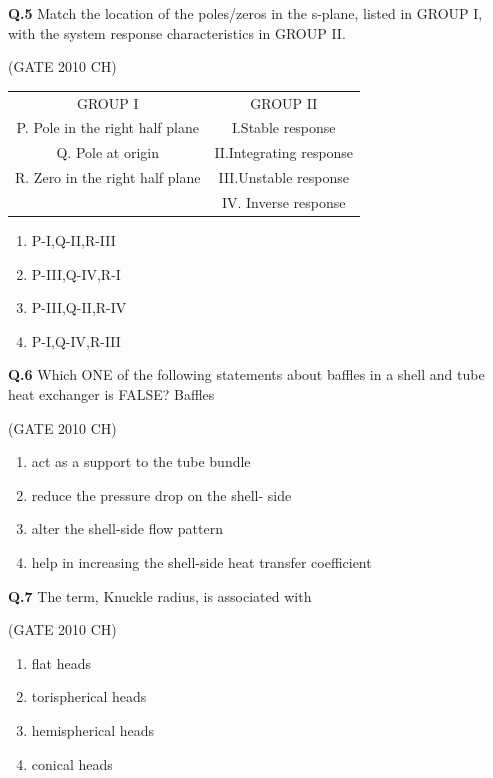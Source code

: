 \documentclass[journal,12pt,onecolumn]{exam}
\theoremstyle{remark}
\begin{document}
\noindent
 \textbf{Q.5}
  Match the location of the poles/zeros in the s-plane, listed in GROUP I, with the system response characteristics in GROUP II.
  
\hfill{(GATE 2010 CH)}\\

 
     \begin{tabular}{c|c}
       GROUP I & GROUP II \\ 
       P. Pole in the right half plane & I.Stable response\\
   Q. Pole at origin & II.Integrating response\\
   R. Zero in the right half plane & III.Unstable response\\ 
                & IV. Inverse response
     \end{tabular}
  
\begin{enumerate}
    \item P-I,Q-II,R-III
    \item P-III,Q-IV,R-I
    \item P-III,Q-II,R-IV
    \item P-I,Q-IV,R-III
    
\end{enumerate}
         
    \noindent
    \textbf{Q.6}
    Which ONE of the following statements about baffles in a shell and tube heat exchanger is FALSE? Baffles
   
\hfill{(GATE 2010 CH)}\\
   
    \begin{enumerate}
        \item act as a support to the tube bundle
        \item reduce the pressure drop on the shell- side
        \item alter the shell-side flow pattern
        \item help in increasing the shell-side heat transfer coefficient
    \end{enumerate}

    \noindent 
    \textbf{Q.7}
    The term, Knuckle radius, is associated with
   
   \hfill{(GATE 2010 CH)}\\
   
   \begin{enumerate}
       \item flat heads
       \item torispherical heads
       \item hemispherical heads
       \item conical heads
   \end{enumerate}
\end{document}
